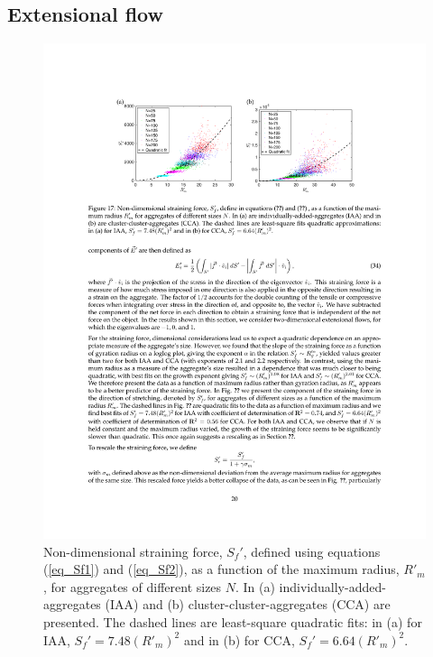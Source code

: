 \subsection{Extensional flow}


\begin{figure}[ht]
	\begin{center}
		 \includegraphics[scale = 1.0]{./figures/fig_strain_allprime.pdf}
	\end{center}
	\caption{Non-dimensional straining force, $S_f'$, defined using equations (\ref{eq_Sf1}) and (\ref{eq_Sf2}), as a function of the maximum radius, $R'_m$, for aggregates of different sizes $N$. In (a) individually-added-aggregates (IAA) and (b) cluster-cluster-aggregates (CCA) are presented. The dashed lines are least-square quadratic fits: in (a) for IAA, $S_f' =7.48 (R'_m)^2 $ and in (b) for CCA, $S_f'  = 6.64 (R'_m)^2$.}
	\label{fig_strain_maxR}
\end{figure}


